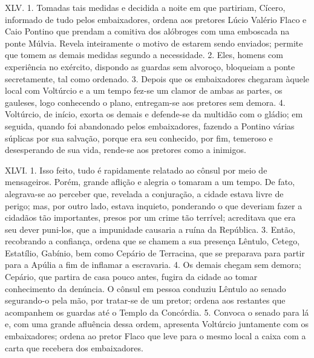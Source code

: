 XLV. 1. Tomadas tais medidas e decidida a noite em que partiriam, Cícero,
informado de tudo pelos embaixadores, ordena aos pretores Lúcio Valério Flaco e
Caio Pontino que prendam a comitiva dos alóbroges com uma emboscada na ponte
Múlvia. Revela inteiramente o motivo de estarem sendo enviados; permite que
tomem as demais medidas segundo a necessidade. 2. Eles, homens com experiência
no exército, dispondo as guardas sem alvoroço, bloqueiam a ponte secretamente,
tal como ordenado. 3. Depois que os embaixadores chegaram àquele local com
Voltúrcio e a um tempo fez-se um clamor de ambas as partes, os gauleses, logo
conhecendo o plano, entregam-se aos pretores sem demora. 4. Voltúrcio, de
início, exorta os demais e defende-se da multidão com o gládio; em seguida,
quando foi abandonado pelos embaixadores, fazendo a Pontino várias súplicas por
sua salvação, porque era seu conhecido, por fim, temeroso e desesperando de sua
vida, rende-se aos pretores como a inimigos.

XLVI. 1. Isso feito, tudo é rapidamente relatado ao cônsul por meio de
mensageiros. Porém, grande aflição e alegria o tomaram a um tempo. De fato,
alegrava-se ao perceber que, revelada a conjuração, a cidade estava livre de
perigo; mas, por outro lado, estava inquieto, ponderando o que deveriam fazer a
cidadãos tão importantes, presos por um crime tão terrível; acreditava que era
seu dever puni-los, que a impunidade causaria a ruína da República. 3. Então,
recobrando a confiança, ordena que se chamem a sua presença Lêntulo,
Cetego, Estatílio, Gabínio, bem como Cepário de Terracina, que se preparava
para partir para a Apúlia a fim de inflamar a escravaria. 4. Os demais chegam
sem demora; Cepário, que partira de casa pouco antes, fugira da cidade ao tomar
conhecimento da denúncia. O cônsul em pessoa conduziu Lêntulo ao senado
segurando-o pela mão, por tratar-se de um pretor; ordena aos restantes que
acompanhem os guardas até o Templo da Concórdia. 5. Convoca o senado para lá e,
com uma grande afluência dessa ordem, apresenta Voltúrcio juntamente com os
embaixadores; ordena ao pretor Flaco que leve para o mesmo local a caixa com a
carta que recebera dos embaixadores.

